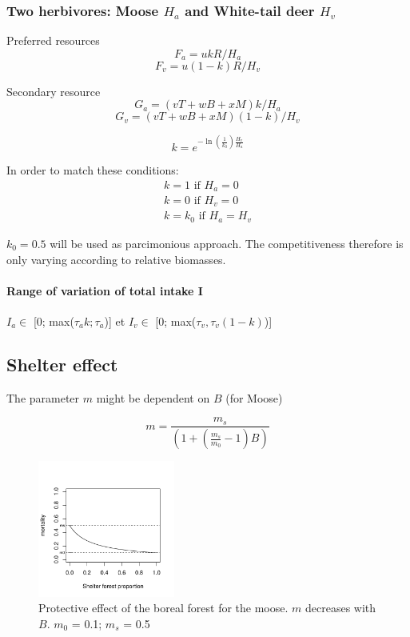 \newpage
\subsubsection*{Two herbivores: Moose $H_a$ and White-tail deer $H_v$}

Preferred resources 
\[
\boxed{
F_a = ukR/H_a
}
\]
\[
\boxed{
F_v = u(1-k)R/H_v
}
\]

Secondary resource 
\[
\boxed{
G_a=(vT + wB + xM)k/H_a}
\]
\[
\boxed{
G_v = (vT + wB + xM)(1-k)/H_v
}
\]


\[
k = e^{-\ln(\frac{1}{k_0})\frac{H_v}{H_a}}
\]

In order to match these conditions:
\[
\left.
\begin{array}{l}
k = 1 \text{ if } H_a=0\\
k = 0 \text{ if } H_v=0\\
k = k_0 \text{ if } H_a=H_v
\end{array}
\right.
\]

$k_0=0.5$ will be used as parcimonious approach. The competitiveness therefore is only varying according to relative biomasses. 

\paragraph{Range of variation of total intake I}

$I_a \in$ [0; max($\tau_a k; \tau_a$)]
et
$I_v \in$ [0; max($\tau_v, \tau_v (1-k)$)]


\subsection*{Shelter effect}

The parameter $m$ might be dependent on $B$ (for Moose)

\[
m = \frac{m_s}{(1+(\frac{m_s}{m_0}-1)B)}
\]
\begin{figure}
\includegraphics[width=0.4\textwidth]{../graphs/shelter_effect.pdf}
  \caption{Protective effect of the boreal forest for the moose. $m$ decreases with $B$. $m_0$ = 0.1; $m_s$ = 0.5 }
\label{shelter}
\end{figure}

